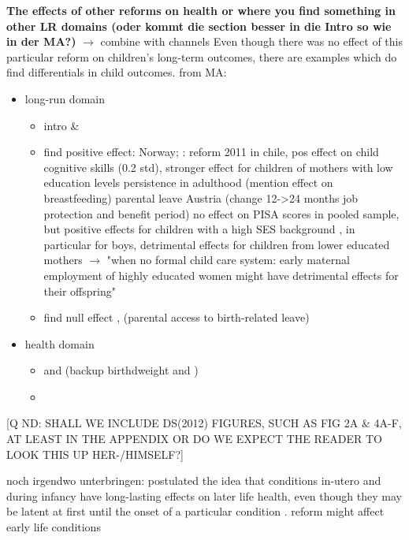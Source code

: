 \documentclass[11pt, a4paper,draft]{article} %
\begin{document}
\textbf{The effects of other reforms on health or where you find something in other LR domains (oder kommt die section besser in die Intro so wie in der MA?)} $\rightarrow$ {\color{red}combine with channels}
Even though there was no effect of this particular reform on children's long-term outcomes, there are examples which do find differentials in child outcomes.
from MA: 
\begin{itemize}
	\item long-run domain
	\begin{itemize}
		\item intro \cite{currie2011human} \& \cite{almond2017childhood}
		\item find positive effect: \cite{carneiro2015flying} Norway; \cite{albagli2018}: reform 2011 in chile, pos effect on child cognitive skills (0.2 std), stronger effect for children of mothers with low education levels persistence in adulthood (mention effect on breastfeeding)  \cite{danzer2017} parental leave Austria (change 12->24 months job protection and benefit period) no effect on PISA scores in pooled sample, but positive effects for children with a high SES background , in particular for boys, detrimental effects for children from lower educated mothers $\rightarrow$ "when no formal  child care system: early maternal employment of highly educated women might have detrimental effects for their offspring"
		\item find null effect \cite{Dahl2016Case}, \cite{rasmussen2010increasing} (parental access to birth-related leave)
	\end{itemize}
	\item health domain
	\begin{itemize}
		\item \cite{stearns2015effects} and \cite{rossin2011effects} (backup birthdweight \cite{almond2005costs} and \cite{currie2007biology})
		\item \cite{beuchert2016}
	\end{itemize}
\end{itemize}


    
[Q ND: SHALL WE INCLUDE DS(2012) FIGURES, SUCH AS FIG 2A \& 4A-F, AT LEAST IN THE APPENDIX OR DO WE EXPECT THE READER TO LOOK THIS UP HER-/HIMSELF?]    



noch irgendwo unterbringen: 
 \cite{Barker1990origins} postulated the idea that conditions in-utero and during infancy have long-lasting effects on later life health, even though they may be latent at first until the onset of a particular condition \citep{almond2011fetalorigins}. reform might affect early life conditions 
\end{document}
